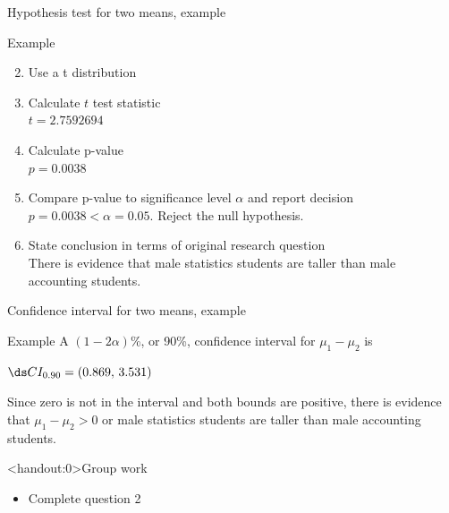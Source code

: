 \documentclass[xcolor=table]{beamer}
\begin{document}
\begin{frame}{Hypothesis test for two means, example}
\begin{exampleblock}{Example}
\large
\begin{enumerate}
\setcounter{enumi}{1}

\item Use a t distribution
\pause\item Calculate $t$ test statistic\\
\pause$t=2.7592694$
\pause\item Calculate p-value\\
\pause$p = 0.0038$
\pause\item Compare p-value to significance level $\alpha$ and report decision\\
\pause$p = 0.0038 < \alpha = 0.05$. Reject the null hypothesis.
\pause\item State conclusion in terms of original research question\\
\pause There is evidence that male statistics students are taller than male accounting students.
\end{enumerate}

\end{exampleblock}
\end{frame}

\begin{frame}{Confidence interval for two means, example}
\begin{exampleblock}{Example}
\large
A $(1-2\alpha)$\%, or 90\%, confidence interval for $\mu_1 - \mu_2$ is\\
\pause\medskip
{\centering $\ds CI_{0.90} = (0.869, \, 3.531)$ \par}
\medskip

\pause Since zero is not in the interval and both bounds are positive, there is evidence that $\mu_1 - \mu_2 > 0$ or male statistics students are taller than male accounting students.

\end{exampleblock}
\end{frame}

\begin{frame}<handout:0>{Group work}
\begin{block}{}
\large
\begin{itemize}
\item Complete question 2
\end{itemize}
\end{block}
\end{frame}
\end{document}
